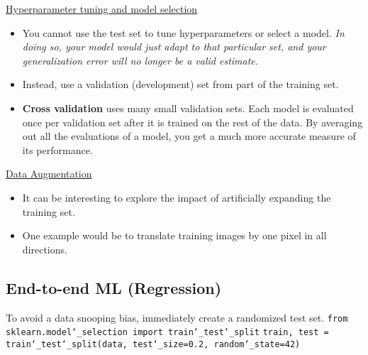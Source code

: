 \vspace{+3.0mm}
\underline{Hyperparameter tuning and model selection}
\begin{itemize}
\vspace{-3.0mm}
\item
You cannot use the test set to tune hyperparameters or select a model.\newline
\textit{In doing so, your model would just adapt to that particular set,
and your generalization error will no longer be a valid estimate.}
\item
Instead, use a validation (development) set from part of the training set.
\item
\textbf{Cross validation} uses many small validation sets.
Each model is evaluated once per validation set after it is trained on the rest of the data.
By averaging out all the evaluations of a model,
you get a much more accurate measure of its performance.
\end{itemize}

\vspace{+3.0mm}
\underline{Data Augmentation}
\begin{itemize}
\vspace{-3.0mm}
\item
It can be interesting to explore the impact of artificially expanding the training set.
\item
One example would be to translate training images by one pixel in all directions.
\end{itemize}

\newpage
\subsection{End-to-end ML (Regression)}

To avoid a data snooping bias, immediately create a randomized test set.\newline
\texttt{from sklearn.model\char`_selection import train\char`_test\char`_split}\newline
\texttt{train, test = train\char`_test\char`_split(data, test\char`_size=0.2, random\char`_state=42)}\newline

